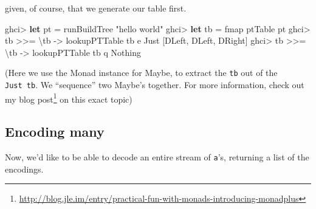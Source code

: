 \documentclass[]{article}
\newenvironment{Shaded}{}{}
\newcommand{\CharTok}[1]{\textcolor[rgb]{0.25,0.44,0.63}{#1}}
\newcommand{\CommentTok}[1]{\textcolor[rgb]{0.38,0.63,0.69}{\textit{#1}}}
\newcommand{\DataTypeTok}[1]{\textcolor[rgb]{0.56,0.13,0.00}{#1}}
\newcommand{\FunctionTok}[1]{\textcolor[rgb]{0.02,0.16,0.49}{#1}}
\newcommand{\KeywordTok}[1]{\textcolor[rgb]{0.00,0.44,0.13}{\textbf{#1}}}
\newcommand{\NormalTok}[1]{#1}
\newcommand{\OperatorTok}[1]{\textcolor[rgb]{0.40,0.40,0.40}{#1}}
\newcommand{\OtherTok}[1]{\textcolor[rgb]{0.00,0.44,0.13}{#1}}
\newcommand{\StringTok}[1]{\textcolor[rgb]{0.25,0.44,0.63}{#1}}
\renewcommand{\href}[2]{#2\footnote{\url{#1}}}
\begin{document}
given, of course, that we generate our table first.

\begin{Shaded}
\begin{Highlighting}[]
\NormalTok{ghci}\OperatorTok{>} \KeywordTok{let}\NormalTok{ pt }\OtherTok{=}\NormalTok{ runBuildTree }\StringTok{"hello world"}
\NormalTok{ghci}\OperatorTok{>} \KeywordTok{let}\NormalTok{ tb }\OtherTok{=} \FunctionTok{fmap}\NormalTok{ ptTable pt}
\NormalTok{ghci}\OperatorTok{>}\NormalTok{ tb }\OperatorTok{>>=}\NormalTok{ \textbackslash{}tb\textquotesingle{} }\OtherTok{{-}>}\NormalTok{ lookupPTTable tb\textquotesingle{} }\CharTok{\textquotesingle{}e\textquotesingle{}}
\DataTypeTok{Just}\NormalTok{ [}\DataTypeTok{DLeft}\NormalTok{, }\DataTypeTok{DLeft}\NormalTok{, }\DataTypeTok{DRight}\NormalTok{]}
\NormalTok{ghci}\OperatorTok{>}\NormalTok{ tb }\OperatorTok{>>=}\NormalTok{ \textbackslash{}tb\textquotesingle{} }\OtherTok{{-}>}\NormalTok{ lookupPTTable tb\textquotesingle{} }\CharTok{\textquotesingle{}q\textquotesingle{}}
\DataTypeTok{Nothing}
\end{Highlighting}
\end{Shaded}

(Here we use the Monad instance for Maybe, to extract the
\texttt{tb\textquotesingle{}} out of the \texttt{Just\ tb}. We ``sequence'' two
Maybe's together. For more information, check out my
\href{http://blog.jle.im/entry/practical-fun-with-monads-introducing-monadplus}{blog
post} on this exact topic)

\hypertarget{encoding-many}{%
\subsection{Encoding many}\label{encoding-many}}

Now, we'd like to be able to decode an entire stream of \texttt{a}'s, returning
a list of the encodings.

\begin{Shaded}
\end{Shaded}
\end{document}
